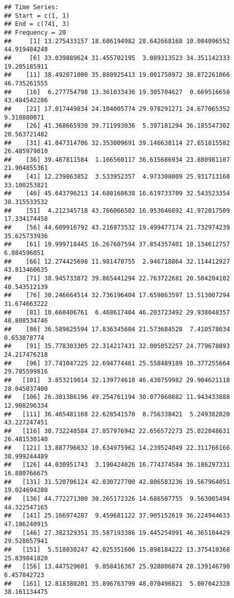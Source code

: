 \documentclass[
]{article}
\begin{document}
\begin{verbatim}
## Time Series:
## Start = c(1, 1) 
## End = c(741, 3) 
## Frequency = 20 
##     [1] 13.275433157 18.606194982 28.642668168 10.084096552 44.919484248
##     [6] 33.039889624 31.455702195  3.089313523 34.351142333 19.205185911
##    [11] 38.492071000 35.880925413 19.001758972 38.872261066 46.735261555
##    [16]  6.277754798 13.361033436 19.305704627  0.669516658 43.484542286
##    [21] 17.017449834 24.104005774 29.978291271 24.677065352  9.310880071
##    [26] 41.368665930 39.711993036  5.397181294 36.185547302 20.563721482
##    [31] 41.047314706 32.353009691 39.146638114 27.651815582 26.485979010
##    [36] 39.467811584  1.166560117 36.615686934 23.880981107 21.904855361
##    [41] 12.239863852  3.533952357  4.973308009 25.931713160 33.100253821
##    [46] 45.643796213 14.680168638 16.619733709 32.543523354 38.315533532
##    [51]  4.212345718 43.766066502 16.953646892 41.972017509 17.334174458
##    [56] 44.609916792 43.216973532 19.499477174 21.732974239 35.625733936
##    [61] 19.999718445 16.267607594 37.854357401 10.134612757  6.084596051
##    [66] 12.274425698 11.981470755  2.946718864 32.114412927 43.813460635
##    [71] 38.945733872 39.865441294 22.763722681 20.504204102 40.543512139
##    [76] 30.246664514 32.736196404 17.659863597 13.513007294 31.674663222
##    [81] 10.660406761  6.468617404 46.203723492 29.938048357 48.808534746
##    [86] 36.589625594 17.836345604 21.573684528  7.410578034  0.653878774
##    [91] 35.778303305 22.314217431 32.005052257 24.779678893 24.217476218
##    [96] 37.741047225 22.694774461 25.558489189 10.377255664 29.785599816
##   [101]  3.853219014 32.139774610 46.430759982 29.904621118 28.045037400
##   [106] 26.301386196 49.254761194 30.077060882 11.943433888 12.908296334
##   [111] 36.465481168 22.628541570  8.756338421  5.249382020 43.227247451
##   [116] 30.732248584 27.857976942 22.656572273 25.022048631 26.481530140
##   [121] 13.887796632 10.634975962 14.239524049 22.311766166 38.999244489
##   [126] 44.030951743  3.190424026 16.774374584 36.186297331 16.880766675
##   [131] 31.520706124 42.030727700 42.806583236 19.567964051 19.024694280
##   [136] 44.772271300 30.265172326 14.686507755  9.563005494 44.322547165
##   [141] 25.166974287  9.459681122 37.905152619 36.224944633 47.186240915
##   [146] 27.382329351 35.587193386 19.445254991 46.365104429 29.528657941
##   [151]  5.518030247 42.025351606 15.898184222 13.375410368 25.839841820
##   [156] 13.447529601  9.058416367 25.928806874 28.139146790  6.457842723
##   [161] 12.818380201 35.896763799 48.070496821  5.007042328 38.161134475

\end{verbatim}
\end{document}
